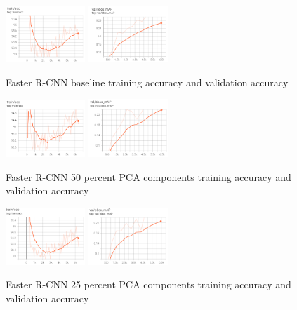 \documentclass[10pt,twocolumn,letterpaper]{article}
\begin{document}
\begin{figure}[ht]
    \centering
    {{\includegraphics[width=3cm]{docs/latex/images/larry/base_results_train_acc.png} }}
    \qquad
    {{\includegraphics[width=3cm]{docs/latex/images/larry/base_results_val.png} }}
    \caption{Faster R-CNN baseline training accuracy and validation accuracy}
    \label{fig:example1}
\end{figure}

\begin{figure}[ht]
    \centering
    {{\includegraphics[width=3cm]{docs/latex/images/larry/base_50_results_train_acc.png} }}
    \qquad
    {{\includegraphics[width=3cm]{docs/latex/images/larry/base_50_results_val.png} }}
    \caption{Faster R-CNN 50 percent PCA components training accuracy and validation accuracy}
    \label{fig:example2}
\end{figure}

\begin{figure}[ht]
    \centering
    {{\includegraphics[width=3cm]{docs/latex/images/larry/base_25_results_train_acc.png} }}
    \qquad
    {{\includegraphics[width=3cm]{docs/latex/images/larry/base_25_results_val.png} }}
    \caption{Faster R-CNN 25 percent PCA components training accuracy and validation accuracy}
    \label{fig:example3}
\end{figure}
\end{document}
